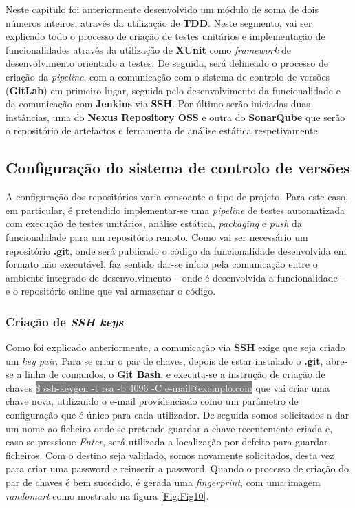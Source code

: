 \hspace{1cm}Neste capitulo foi anteriormente desenvolvido um módulo de soma de dois números inteiros, através da utilização de \textbf{TDD}. Neste segmento, vai ser explicado todo o processo de criação de testes unitários e implementação de funcionalidades através da utilização de \textbf{XUnit} como \textit{framework} de desenvolvimento orientado a testes. De seguida, será delineado o processo de criação da \textit{pipeline}, com a comunicação com o sistema de controlo de versões (\textbf{GitLab}) em primeiro lugar, seguida pelo desenvolvimento da funcionalidade e da comunicação com \textbf{Jenkins} via \textbf{SSH}. Por último serão iniciadas duas instâncias, uma do \textbf{Nexus Repository OSS} e outra do \textbf{SonarQube} que serão o repositório de artefactos e ferramenta de análise estática respetivamente.

\subsection{Configuração do sistema de controlo de versões}

\hspace{1cm}A configuração dos repositórios varia consoante o tipo de projeto. Para este caso, em particular, é pretendido implementar-se uma \textit{pipeline} de testes automatizada com execução de testes unitários, análise estática, \textit{packaging} e \textit{push} da funcionalidade para um repositório remoto. Como vai ser necessário um repositório \textbf{.git}, onde será publicado o código da funcionalidade desenvolvida em formato não executável, faz sentido dar-se início pela comunicação entre o ambiente integrado de desenvolvimento -- onde é desenvolvida a funcionalidade -- e o repositório online que vai armazenar o código. 
\subsubsection{Criação de \textit{SSH keys}}

\hspace{1cm}Como foi explicado anteriormente, a comunicação via \textbf{SSH} exige que seja criado um \textit{key pair}. Para se criar o par de chaves, depois de estar instalado o \textbf{.git}, abre-se a linha de comandos, o \textbf{Git Bash}, e executa-se a instrução de criação de chaves  \colorbox{gray}{\textcolor{white}{\$ ssh-keygen -t rsa -b 4096 -C e-mail@exemplo.com}} que vai criar uma chave nova, utilizando o e-mail providenciado como um parâmetro de configuração que é único para cada utilizador. De seguida somos solicitados a dar um nome ao ficheiro onde se pretende guardar a chave recentemente criada e, caso se pressione \textit{Enter}, será utilizada a localização por defeito para guardar ficheiros. Com o destino seja validado, somos novamente solicitados, desta vez para criar uma password e reinserir a password. Quando o processo de criação do par de chaves é bem sucedido, é gerada uma \textit{fingerprint}, com uma imagem \textit{randomart} como mostrado na figura \ref{Fig:Fig10}. 

